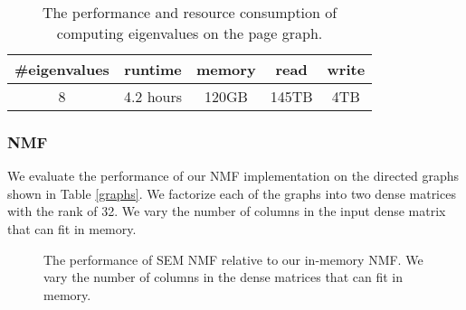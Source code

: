
\begin{table}
	\begin{center}
		\small
		\begin{tabular}{|c|c|c|c|c|}
			\hline
			\#eigenvalues & runtime & memory & read & write \\
			\hline
			8 & 4.2 hours & 120GB & 145TB & 4TB \\
			\hline
		\end{tabular}
		\normalsize
	\end{center}
	\caption{The performance and resource consumption of computing eigenvalues
	on the page graph.}
	\label{pg_ev}
\end{table}


\subsubsection{NMF}
We evaluate the performance of our NMF implementation on the directed graphs
shown in Table \ref{graphs}. We factorize each of the graphs into two dense
matrices with the rank of 32. We vary the number of columns in the input dense
matrix that can fit in memory.

\begin{figure}
	\begin{center}
		\footnotesize
		
		\caption{The performance of SEM NMF relative to our in-memory NMF.
			We vary the number of columns in the dense matrices that can fit
		in memory.}
		\label{perf:NMF}
	\end{center}
\end{figure}
